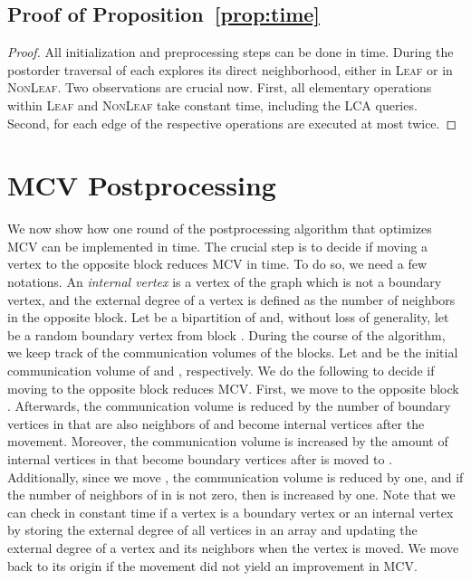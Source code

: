 \documentclass[pdftex]{llncs}
\numberwithin{equation}{section}
\numberwithin{example}{section}
\numberwithin{table}{section}
\begin{document}
\subsection{Proof of Proposition~\ref{prop:time}}
\begin{proof}
All initialization and preprocessing steps can be done in 
time. During the postorder traversal of  each  explores
its direct neighborhood, either in \textsc{Leaf} or in
\textsc{NonLeaf}. Two observations are crucial now. First, all
elementary operations within \textsc{Leaf} and \textsc{NonLeaf} take
constant time, including the LCA queries. Second, for each edge of
 the respective operations are executed at most twice.
\end{proof}

\section{MCV Postprocessing}
\label{sec:mcv-apx}
We now show how one round of the postprocessing algorithm that
optimizes MCV can be implemented in 
time.  The crucial step is to decide if moving a vertex  to the
opposite block reduces MCV in  time. To do so, we need a
few notations.  An \emph{internal vertex} is a vertex of the graph
which is not a boundary vertex, and the external degree of a vertex is
defined as the number of neighbors in the opposite block.  Let  be a bipartition of  and, without loss of generality, let 
be a random boundary vertex from block . During the course of the
algorithm, we keep track of the communication volumes of the
blocks. Let  and  be the initial communication volume of
 and , respectively. We do the following to decide if moving
 to the opposite block reduces MCV.  First, we move  to the
opposite block . Afterwards, the communication volume  is
reduced by the number of boundary vertices in  that are also
neighbors of  and become internal vertices after the movement.
Moreover, the communication volume  is increased by the amount of
internal vertices in  that become boundary vertices after  is
moved to .  Additionally, since we move , the communication
volume  is reduced by one, and if the number of neighbors of 
in  is not zero, then  is increased by one.  Note that we
can check in constant time if a vertex is a boundary vertex or an
internal vertex by storing the external degree of all vertices in an
array and updating the external degree of a vertex and its neighbors
when the vertex is moved.  We move  back to its origin if the
movement did not yield an improvement in MCV.
\end{document}
